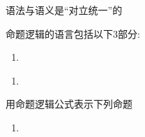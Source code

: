 
\begin{frame}{}
  \begin{center}

    \vspace{0.60cm}
    语法与语义是``对立统一''的
  \end{center}
\end{frame}

\begin{frame}{}
\end{frame}

\begin{frame}{}
\end{frame}

\begin{frame}{}
  \begin{definition}[命题逻辑的语言]
    命题逻辑的语言包括以下3部分:
    \begin{enumerate}[(1)]
      \setlength{\itemsep}{5pt}
      \item
    \end{enumerate}
  \end{definition}
\end{frame}

\begin{frame}{}
  \begin{definition}[公式 (Formula)]
    \begin{enumerate}[(1)]
      \setlength{\itemsep}{8pt}
      \item 
    \end{enumerate}
  \end{definition}
\end{frame}

\begin{frame}{}
\end{frame}

\begin{frame}{}
\end{frame}

\begin{frame}{}
\end{frame}

\begin{frame}{}
\end{frame}

\begin{frame}{}
  \begin{exampleblock}{用命题逻辑公式表示下列命题}
    \begin{enumerate}[<+->][(1)]
      \setlength{\itemsep}{8pt}
      \item
    \end{enumerate}
  \end{exampleblock}
\end{frame}
